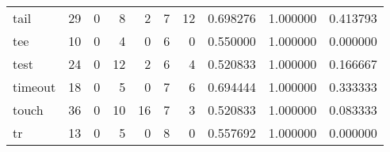 \begin{longtable}{lrrrrrrrrr}
tail      &                                       29 &                                                  0 &                                                  8 &                                                  2 &                                                  7 &                                                 12 &                                           0.698276 &                               1.000000 &                             0.413793 \\
tee       &                                       10 &                                                  0 &                                                  4 &                                                  0 &                                                  6 &                                                  0 &                                           0.550000 &                               1.000000 &                             0.000000 \\
test      &                                       24 &                                                  0 &                                                 12 &                                                  2 &                                                  6 &                                                  4 &                                           0.520833 &                               1.000000 &                             0.166667 \\
timeout   &                                       18 &                                                  0 &                                                  5 &                                                  0 &                                                  7 &                                                  6 &                                           0.694444 &                               1.000000 &                             0.333333 \\
touch     &                                       36 &                                                  0 &                                                 10 &                                                 16 &                                                  7 &                                                  3 &                                           0.520833 &                               1.000000 &                             0.083333 \\
tr        &                                       13 &                                                  0 &                                                  5 &                                                  0 &                                                  8 &                                                  0 &                                           0.557692 &                               1.000000 &                             0.000000 \\

\end{longtable}
